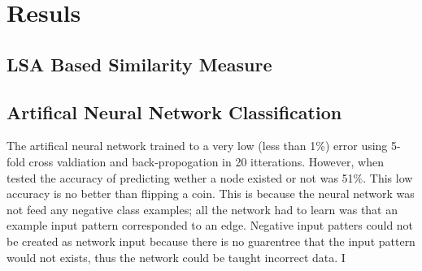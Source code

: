 \section{Resuls}
\label{sec:Results}

\subsection{LSA Based Similarity Measure}

\subsection{Artifical Neural Network Classification}

The artifical neural network trained to a very low (less than 1\%) error using 5-fold cross valdiation and back-propogation in 20 itterations. 
However, when tested the accuracy of predicting wether a node existed or not was 51\%.  This low accuracy is no better than flipping a coin.
This is because the neural network was not feed any negative class examples; all the network had to learn was that an example input pattern corresponded to an edge.
Negative input patters could not be created as network input because there is no guarentree that the input pattern would not exists, thus the network could be taught incorrect data.
I
